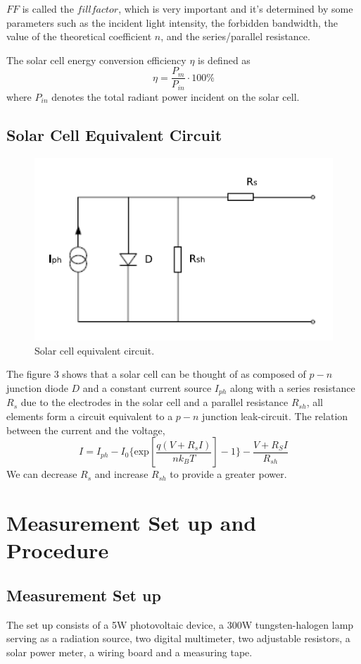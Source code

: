 \documentclass[12pt]{article}
\begin{document}
$FF$ is called the $fill factor$, which is very important and it's determined by some parameters such as the incident light intensity, the forbidden bandwidth, the value of
the theoretical coefficient $n$, and the series/parallel resistance.
\par The solar cell energy conversion efficiency $\eta$ is defined as
$$\eta=\frac{P_m}{P_{in}}\cdot 100\%$$
where $P_{in}$ denotes the total radiant power incident on the solar cell.
\subsection{Solar Cell Equivalent Circuit}
\begin{figure}[H]
\centering
\includegraphics[scale=0.5]{P3.jpg}
\caption{Solar cell equivalent circuit.}
\end{figure}
The figure 3 shows that a solar cell can be thought of as composed of $p-n$ junction diode $D$ and a constant current source $I_{ph}$ along with a series resistance $R_s$ due to
the electrodes in the solar cell and a parallel resistance $R_{sh}$, all elements form a circuit equivalent to a $p-n$ junction leak-circuit. The relation between the current and the voltage,
$$I=I_{ph}-I_0\{\mathrm{exp}[\frac{q(V+R_sI)}{nk_BT}]-1\}-\frac{V+R_SI}{R_{sh}}$$
We can decrease $R_s$ and increase $R_{sh}$ to provide a greater power.
\section{Measurement Set up and Procedure}
\subsection{Measurement Set up}
The set up consists of a 5W photovoltaic device, a 300W tungsten-halogen lamp serving as a radiation source, two digital multimeter, two adjustable resistors, a solar power meter, a wiring board and a measuring tape.
\end{document}
